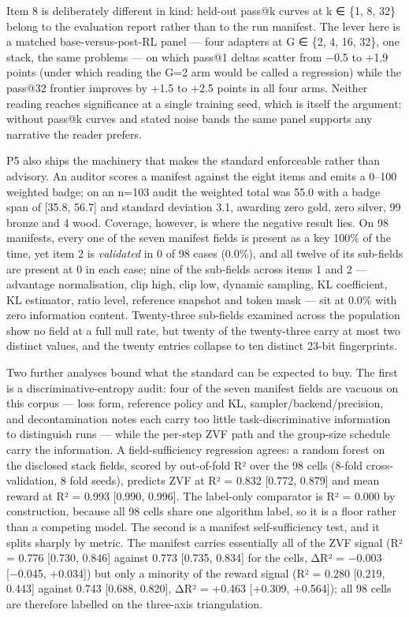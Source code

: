 \documentclass[12pt,a4paper]{report}
\newcommand{\longtok}[1]{\texttt{\seqsplit{#1}}}
\begin{document}
Item 8 is deliberately different in kind: held-out pass@k curves at k ∈
\{1, 8, 32\} belong to the evaluation report rather than to the run
manifest. The lever here is a matched base-versus-post-RL panel --- four
adapters at G ∈ \{2, 4, 16, 32\}, one stack, the same problems --- on
which pass@1 deltas scatter from −0.5 to +1.9 points (under which
reading the G=2 arm would be called a regression) while the pass@32
frontier improves by +1.5 to +2.5 points in all four arms. Neither
reading reaches significance at a single training seed, which is itself
the argument: without pass@k curves and stated noise bands the same
panel supports any narrative the reader prefers.

P5 also ships the machinery that makes the standard enforceable rather
than advisory. An auditor scores a manifest against the eight items and
emits a 0--100 weighted badge; on an n=103 audit the weighted total was
55.0 with a badge span of {[}35.8, 56.7{]} and standard deviation 3.1,
awarding zero gold, zero silver, 99 bronze and 4 wood. Coverage,
however, is where the negative result lies. On 98 manifests, every one
of the seven manifest fields is present as a key 100\% of the time, yet
item 2 is \emph{validated} in 0 of 98 cases (0.0\%), and all twelve of
its sub-fields are present at 0 in each case; nine of the sub-fields
across items 1 and 2 --- advantage normalisation, clip high, clip low,
dynamic sampling, KL coefficient, KL estimator, ratio level, reference
snapshot and token mask --- sit at 0.0\% with zero information content.
Twenty-three sub-fields examined across the population show no field at
a full null rate, but twenty of the twenty-three carry at most two
distinct values, and the twenty entries collapse to ten distinct 23-bit
fingerprints.

Two further analyses bound what the standard can be expected to buy. The
first is a discriminative-entropy audit: four of the seven manifest
fields are vacuous on this corpus --- loss form, reference policy and
KL, sampler/backend/precision, and decontamination notes each carry too
little task-discriminative information to distinguish runs --- while the
per-step ZVF path and the group-size schedule carry the information. A
field-sufficiency regression agrees: a random forest on the disclosed
stack fields, scored by out-of-fold R² over the 98 cells (8-fold
cross-validation, 8 fold seeds), predicts ZVF at R² = 0.832 {[}0.772,
0.879{]} and mean reward at R² = 0.993 {[}0.990, 0.996{]}. The
label-only comparator is R² = 0.000 by construction, because all 98
cells share one algorithm label, so it is a floor rather than a
competing model. The second is a manifest self-sufficiency test, and it
splits sharply by metric. The manifest carries essentially all of the
ZVF signal (R² = 0.776 {[}0.730, 0.846{]} against 0.773 {[}0.735,
0.834{]} for the cells, ΔR² = −0.003 {[}−0.045, +0.034{]}) but only a
minority of the reward signal (R² = 0.280 {[}0.219, 0.443{]} against
0.743 {[}0.688, 0.820{]}, ΔR² = +0.463 {[}+0.309, +0.564{]}); all 98
cells are therefore labelled \longtok{honest\_\allowbreak{}but\_\allowbreak{}vacuous} on the
three-axis triangulation.
\end{document}
